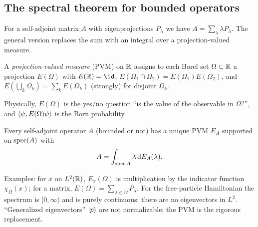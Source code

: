 \subsection{The spectral theorem for bounded operators}

For a self-adjoint matrix $A$ with eigenprojections $P_\lambda$ we have $A=\sum_\lambda\lambda P_\lambda$. The general version replaces the sum with an integral over a projection-valued measure.

\begin{definition}
A \emph{projection-valued measure} (PVM) on $\mathbb{R}$ assigns to each Borel set $\Omega\subset\mathbb{R}$ a projection $E(\Omega)$ with $E(\R)=\id$, $E(\Omega_1\cap\Omega_2)=E(\Omega_1)E(\Omega_2)$, and $E(\bigcup_k\Omega_k)=\sum_kE(\Omega_k)$ (strongly) for disjoint $\Omega_k$.
\end{definition}

Physically, $E(\Omega)$ is the yes/no question ``is the value of the observable in $\Omega$?'', and $\langle \psi,E(\Omega)\psi\rangle$ is the Born probability.

\begin{theorem}\label{thm:spectral}
Every self-adjoint operator $A$ (bounded or not) has a unique PVM $E_A$ supported on $\operatorname{spec}(A)$ with
\begin{equation}
A=\int_{\operatorname{spec} A}\lambda\,\mathrm{d} E_A(\lambda).
\end{equation}
\end{theorem}

Examples: for $x$ on $L^2(\mathbb{R})$, $E_x(\Omega)$ is multiplication by the indicator function $\chi_\Omega(x)$; for a matrix, $E(\Omega)=\sum_{\lambda\in\Omega}P_\lambda$. For the free-particle Hamiltonian the spectrum is $[0,\infty)$ and is purely continuous: there are no eigenvectors in $L^2$. ``Generalized eigenvectors'' $\lvert p\rangle$ are not normalizable; the PVM is the rigorous replacement.

